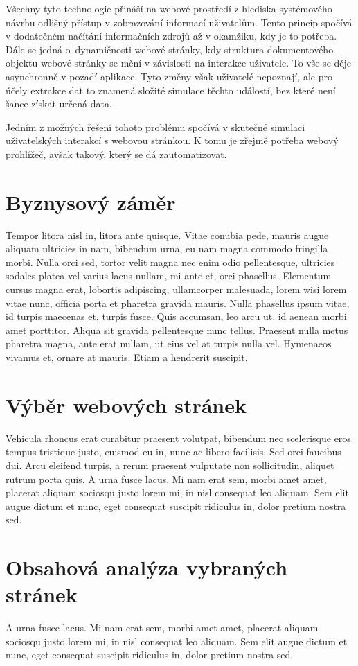 \documentclass[11pt,a4paper]{article}
\begin{document}
Všechny tyto technologie přináší na webové prostředí z hlediska systémového návrhu odlišný přístup v zobrazování informací uživatelům. Tento princip spočívá v dodatečném načítání informačních zdrojů až v okamžiku, kdy je to potřeba. Dále se jedná o~dynamičnosti webové stránky, kdy struktura dokumentového objektu webové stránky se mění v závislosti na interakce uživatele. To vše se děje asynchronně v pozadí aplikace. Tyto změny však uživatelé nepoznají, ale pro účely extrakce dat to znamená složité simulace těchto událostí, bez které není šance získat určená data.

Jedním z možných řešení tohoto problému spočívá v skutečné simulaci uživatelských interakcí s webovou stránkou. K tomu je zřejmě potřeba webový prohlížeč, avšak takový, který se dá zautomatizovat.

\section{Byznysový záměr}
Tempor litora nisl in, litora ante quisque. Vitae conubia pede, mauris augue aliquam ultricies in nam, bibendum urna, eu nam magna commodo fringilla morbi. Nulla orci sed, tortor velit magna nec enim odio pellentesque, ultricies sodales platea vel varius lacus nullam, mi ante et, orci phasellus. Elementum cursus magna erat, lobortis adipiscing, ullamcorper malesuada, lorem wisi lorem vitae nunc, officia porta et pharetra gravida mauris. Nulla phasellus ipsum vitae, id turpis maecenas et, turpis fusce. Quis accumsan, leo arcu ut, id aenean morbi amet porttitor. Aliqua sit gravida pellentesque nunc tellus. Praesent nulla metus pharetra magna, ante erat nullam, ut eius vel at turpis nulla vel. Hymenaeos vivamus et, ornare at mauris. Etiam a hendrerit suscipit.

\section{Výběr webových stránek}
Vehicula rhoncus erat curabitur praesent volutpat, bibendum nec scelerisque eros tempus tristique justo, euismod eu in, nunc ac libero facilisis. Sed orci faucibus dui. Arcu eleifend turpis, a rerum praesent vulputate non sollicitudin, aliquet rutrum porta quis. A urna fusce lacus. Mi nam erat sem, morbi amet amet, placerat aliquam sociosqu justo lorem mi, in nisl consequat leo aliquam. Sem elit augue dictum et nunc, eget consequat suscipit ridiculus in, dolor pretium nostra sed.

\section{Obsahová analýza vybraných stránek}
A urna fusce lacus. Mi nam erat sem, morbi amet amet, placerat aliquam sociosqu justo lorem mi, in nisl consequat leo aliquam. Sem elit augue dictum et nunc, eget consequat suscipit ridiculus in, dolor pretium nostra sed.
\end{document}

